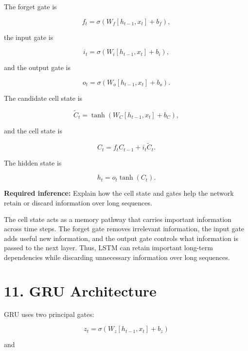 \documentclass[10pt]{article}
\begin{document}
The forget gate is

\[
f_t=\sigma(W_f[h_{t-1},x_t]+b_f),
\]

the input gate is

\[
i_t=\sigma(W_i[h_{t-1},x_t]+b_i),
\]

and the output gate is

\[
o_t=\sigma(W_o[h_{t-1},x_t]+b_o).
\]

The candidate cell state is

\[
\tilde{C}_t=
\tanh(W_C[h_{t-1},x_t]+b_C),
\]

and the cell state is

\[
C_t=f_tC_{t-1}+i_t\tilde{C}_t.
\]

The hidden state is

\[
h_t=o_t\tanh(C_t).
\]

\begin{center}
\end{center}

\textbf{Required inference:} Explain how the cell state and gates help the
network retain or discard information over long sequences.

The cell state acts as a memory pathway that carries important information across time steps. The forget gate removes irrelevant information, the input gate adds useful new information, and the output gate controls what information is passed to the next layer. Thus, LSTM can retain important long-term dependencies while discarding unnecessary information over long sequences.

\section*{11. GRU Architecture}

GRU uses two principal gates:

\[
z_t=\sigma(W_z[h_{t-1},x_t]+b_z)
\]

and
\end{document}
